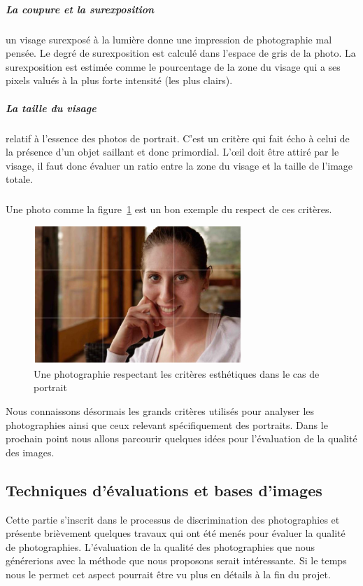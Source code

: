 \documentclass[11pt, french,screen]{report-rd-info}
\begin{document}
\subparagraph{La coupure et la surexposition} un visage surexposé à la lumière donne une impression de photographie mal pensée. Le degré de  surexposition est calculé dans l’espace de gris de la photo. La surexposition est estimée comme le pourcentage de la zone du visage qui a ses pixels valués à la plus forte intensité (les plus clairs).
\subparagraph{La taille du visage} relatif à l’essence des photos de portrait. C'est un critère qui fait écho à celui de la présence d'un objet saillant et donc primordial. L’œil doit être attiré par le visage, il faut donc évaluer un ratio entre la zone du visage et la taille de l’image totale.
\subparagraph*{}
Une photo comme la figure~\ref{fig:VisageAgreable} est un bon exemple du respect de ces critères.
\begin{figure}
	\centering
	\includegraphics[width=0.7\textwidth]{Images/ea_visageagreable}
	\caption{Une photographie respectant les critères esthétiques dans le cas de portrait\cite{Males2013}}
	\label{fig:VisageAgreable}
\end{figure}
Nous connaissons désormais les grands critères utilisés pour analyser les photographies ainsi que ceux relevant spécifiquement des portraits. Dans le prochain point nous allons parcourir quelques idées pour l'évaluation de la qualité des images.
\subsection{Techniques d’évaluations et bases d’images}
Cette partie s’inscrit dans le processus de discrimination des photographies et présente brièvement quelques travaux qui ont été menés pour évaluer la qualité de photographies. L’évaluation de la qualité des photographies que nous générerions avec la méthode que nous proposons serait intéressante. Si le temps nous le permet cet aspect pourrait être vu plus en détails à la fin du projet.
\end{document}
